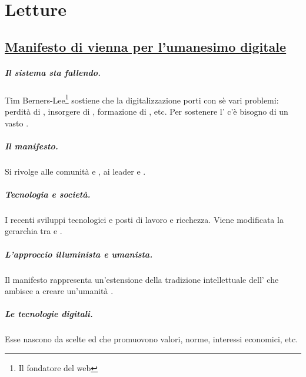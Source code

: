 \chapter{Letture}

\section{\href{https://dighum.ec.tuwien.ac.at/wp-content/uploads/2019/07/Vienna_Manifesto_on_Digital_Humanism_IT.pdf}{Manifesto di vienna per l'umanesimo digitale}}

\paragraph{Il sistema sta fallendo.} Tim Berners-Lee\footnote{Il fondatore del web} sostiene che la digitalizzazione porti con sè vari problemi: perdità di , insorgere di , formazione di , etc. Per sostenere l' c'è bisogno di un vasto .

\paragraph{Il manifesto.} Si rivolge alle comunità  e , ai leader  e .

\paragraph{Tecnologia e società.} I recenti sviluppi tecnologici  e  posti di lavoro e ricchezza. Viene modificata la gerarchia tra  e .

\paragraph{L'approccio illuminista e umanista.} Il manifesto rappresenta un'estensione della tradizione intellettuale dell' che ambisce a creare un'umanità .

\paragraph{Le tecnologie digitali.} Esse nascono da scelte  ed  che promuovono valori, norme, interessi economici, etc.

